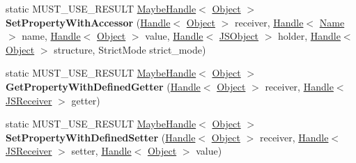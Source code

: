 \begin{DoxyCompactItemize}
\item 
\hypertarget{classv8_1_1internal_1_1_object_a2ac2a762a1b0ed8dd9cd799aa16a1ace}{}static M\+U\+S\+T\+\_\+\+U\+S\+E\+\_\+\+R\+E\+S\+U\+L\+T \hyperlink{classv8_1_1internal_1_1_maybe_handle}{Maybe\+Handle}$<$ \hyperlink{classv8_1_1internal_1_1_object}{Object} $>$ {\bfseries Set\+Property\+With\+Accessor} (\hyperlink{classv8_1_1internal_1_1_handle}{Handle}$<$ \hyperlink{classv8_1_1internal_1_1_object}{Object} $>$ receiver, \hyperlink{classv8_1_1internal_1_1_handle}{Handle}$<$ \hyperlink{classv8_1_1internal_1_1_name}{Name} $>$ name, \hyperlink{classv8_1_1internal_1_1_handle}{Handle}$<$ \hyperlink{classv8_1_1internal_1_1_object}{Object} $>$ value, \hyperlink{classv8_1_1internal_1_1_handle}{Handle}$<$ \hyperlink{classv8_1_1internal_1_1_j_s_object}{J\+S\+Object} $>$ holder, \hyperlink{classv8_1_1internal_1_1_handle}{Handle}$<$ \hyperlink{classv8_1_1internal_1_1_object}{Object} $>$ structure, Strict\+Mode strict\+\_\+mode)\label{classv8_1_1internal_1_1_object_a2ac2a762a1b0ed8dd9cd799aa16a1ace}

\item 
\hypertarget{classv8_1_1internal_1_1_object_a60e3ff2136485ae51459dee807c848ff}{}static M\+U\+S\+T\+\_\+\+U\+S\+E\+\_\+\+R\+E\+S\+U\+L\+T \hyperlink{classv8_1_1internal_1_1_maybe_handle}{Maybe\+Handle}$<$ \hyperlink{classv8_1_1internal_1_1_object}{Object} $>$ {\bfseries Get\+Property\+With\+Defined\+Getter} (\hyperlink{classv8_1_1internal_1_1_handle}{Handle}$<$ \hyperlink{classv8_1_1internal_1_1_object}{Object} $>$ receiver, \hyperlink{classv8_1_1internal_1_1_handle}{Handle}$<$ \hyperlink{classv8_1_1internal_1_1_j_s_receiver}{J\+S\+Receiver} $>$ getter)\label{classv8_1_1internal_1_1_object_a60e3ff2136485ae51459dee807c848ff}

\item 
\hypertarget{classv8_1_1internal_1_1_object_a1d50e0218a59c0620e3a5ffeab07703e}{}static M\+U\+S\+T\+\_\+\+U\+S\+E\+\_\+\+R\+E\+S\+U\+L\+T \hyperlink{classv8_1_1internal_1_1_maybe_handle}{Maybe\+Handle}$<$ \hyperlink{classv8_1_1internal_1_1_object}{Object} $>$ {\bfseries Set\+Property\+With\+Defined\+Setter} (\hyperlink{classv8_1_1internal_1_1_handle}{Handle}$<$ \hyperlink{classv8_1_1internal_1_1_object}{Object} $>$ receiver, \hyperlink{classv8_1_1internal_1_1_handle}{Handle}$<$ \hyperlink{classv8_1_1internal_1_1_j_s_receiver}{J\+S\+Receiver} $>$ setter, \hyperlink{classv8_1_1internal_1_1_handle}{Handle}$<$ \hyperlink{classv8_1_1internal_1_1_object}{Object} $>$ value)\label{classv8_1_1internal_1_1_object_a1d50e0218a59c0620e3a5ffeab07703e}


\end{DoxyCompactItemize}
